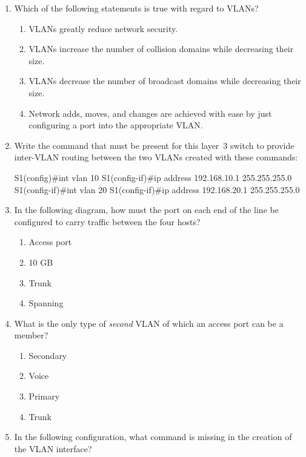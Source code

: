 \begin{enumerate}
\item
  Which of the following statements is true with regard to VLANs?

  \begin{enumerate}
    \item
    VLANs greatly reduce network security.
  \item
    VLANs increase the number of collision domains while decreasing
    their size.
  \item
    VLANs decrease the number of broadcast domains while decreasing
    their size.
  \item
    Network adds, moves, and changes are achieved with ease by just
    configuring a port into the appropriate VLAN.
  \end{enumerate}
\item
  Write the command that must be present for this layer~3 switch to
  provide inter-VLAN routing between the two VLANs created with these
  commands:

\begin{cli}
S1(config)#int vlan 10
S1(config-if)#ip address 192.168.10.1 255.255.255.0
S1(config-if)#int vlan 20
S1(config-if)#ip address 192.168.20.1 255.255.255.0
\end{cli}
\item
  In the following diagram, how must the port on each end of the line be
  configured to carry traffic between the four hosts?

  \begin{figure}
  \centering
  \caption{}
  \end{figure}

  \begin{enumerate}
    \item
     Access port
  \item
    10 GB
  \item
    Trunk
  \item
    Spanning
  \end{enumerate}
\item
  What is the only type of \emph{second} VLAN of which an access port
  can be a member?

  \begin{enumerate}
    \item
    Secondary
  \item
    Voice
  \item
    Primary
  \item
    Trunk
  \end{enumerate}
\item
  In the following configuration, what command is missing in the
  creation of the VLAN interface?


\end{enumerate}
